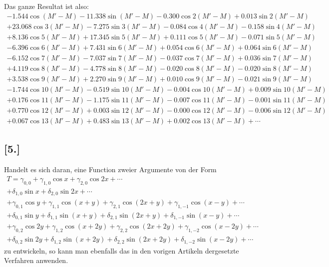 \documentclass[12pt,a4paper]{article}
\begin{document}
Das ganze Resultat ist also:
\begin{multline*}
-1.544 \cos(M'-M) - 11.338 \sin(M'-M) - 0.300 \cos 2(M'-M) + 0.013 \sin 2(M'-M)\\
+ 23.068 \cos 3(M'-M) - 7.275 \sin 3(M'-M) - 0.084 \cos 4(M'-M) - 0.158 \sin 4(M'-M)\\
+ 8.136 \cos 5(M'-M) + 17.345 \sin 5(M'-M) + 0.111 \cos 5(M'-M) - 0.071 \sin 5(M'-M)\\
- 6.396 \cos 6(M'-M) + 7.431 \sin 6(M'-M) + 0.054 \cos 6(M'-M) + 0.064 \sin 6(M'-M)\\
- 6.152 \cos 7(M'-M) - 7.037 \sin 7(M'-M) - 0.037 \cos 7(M'-M) + 0.036 \sin 7(M'-M)\\
+ 4.119 \cos 8(M'-M) - 4.778 \sin 8(M'-M) - 0.020 \cos 8(M'-M) - 0.020 \sin 8(M'-M)\\
+ 3.538 \cos 9(M'-M) + 2.270 \sin 9(M'-M) + 0.010 \cos 9(M'-M) - 0.021 \sin 9(M'-M)\\
- 1.744 \cos 10(M'-M) - 0.519 \sin 10(M'-M) - 0.004 \cos 10(M'-M) + 0.009 \sin 10(M'-M)\\
+ 0.176 \cos 11(M'-M) - 1.175 \sin 11(M'-M) - 0.007 \cos 11(M'-M) - 0.001 \sin 11(M'-M)\\
+ 0.770 \cos 12(M'-M) + 0.003 \sin 12(M'-M) - 0.000 \cos 12(M'-M) - 0.006 \sin 12(M'-M)\\
+ 0.067 \cos 13(M'-M) + 0.483 \sin 13(M'-M) + 0.002 \cos 13(M'-M) + \cdots
\end{multline*}

\subsection*{[5.]}

Handelt es sich daran, eine Function zweier Argumente von der Form
\begin{multline*}
T = \gamma_{0,0} + \gamma_{1,0} \cos x + \gamma_{2,0} \cos 2x + \cdots \\
+ \delta_{1,0} \sin x + \delta_{2,0} \sin 2x + \cdots \\
+ \gamma_{0,1} \cos y + \gamma_{1,1} \cos(x+y) + \gamma_{2,1} \cos(2x+y) + \gamma_{1,-1} \cos(x-y) + \cdots \\
+ \delta_{0,1} \sin y + \delta_{1,1} \sin(x+y) + \delta_{2,1} \sin(2x+y) + \delta_{1,-1} \sin(x-y) + \cdots \\
+ \gamma_{0,2} \cos 2y + \gamma_{1,2} \cos(x+2y) + \gamma_{2,2} \cos(2x+2y) + \gamma_{1,-2} \cos(x-2y) + \cdots \\
+ \delta_{0,2} \sin 2y + \delta_{1,2} \sin(x+2y) + \delta_{2,2} \sin(2x+2y) + \delta_{1,-2} \sin(x-2y) + \cdots
\end{multline*}
zu entwickeln, so kann man ebenfalls das in den vorigen Artikeln dergesetzte Verfahren anwenden.
\end{document}
